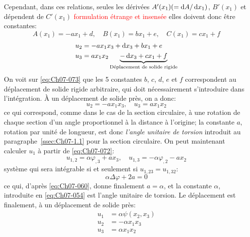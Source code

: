 Cependant, dans ces relations, seules les dérivées $A'(x_1) (=\mathop{\mathrm{{}d}}\mathopen{} A /\mathop{\mathrm{{}d}}\mathopen{} x_1)$, $B'(x_1)$ et dépendent de $C'(x_1)$ \textcolor{red}{formulation étrange et insensée} elles doivent donc être constantes:
\begin{equation}
A(x_1) = -a x_1 +d,\quad B(x_1) = b x_1 +e,\quad C(x_1) = c x_1 +f
\end{equation}
\begin{equation}
    \begin{aligned}
        u_2 &= -a x_1 x_3 + \mathop{\mathrm{{}d}}\mathopen{} x_3 + b x_1 + e\\
        u_3 &= a x_1 x_2 \underbrace{- \mathop{\mathrm{{}d}}\mathopen{} x_3 + c x_1 + f}_{\text{Déplacement de solide rigide}}
    \end{aligned}
    \label{eq:Ch07-073} 
\end{equation}
On voit sur \eqref{eq:Ch07-073} que les 5 constantes $b$, $c$, $d$, $e$ et $f$ correspondent au déplacement de solide rigide arbitraire, qui doit nécessairement s'introduire dans l'intégration.
\`A un déplacement de solide près, on a donc: 
\begin{equation}
    u_2 = -a x_1 x_3, \quad u_3 = a x_1 x_2
    \label{eq:Ch07-074}
\end{equation}
ce qui correspond, comme dans le cas de la section circulaire, à une rotation de chaque section d'un angle proportionnel à la distance à l'origine; la constante $a$, rotation par unité de longueur, est donc \emph{l'angle unitaire de torsion} introduit au paragraphe~\ref{ssec:Ch07-1.1} pour la section circulaire.
On peut maintenant calculer $u_1$ à partir de \eqref{eq:Ch07-072}: 
\begin{equation}
    u_{1,2} = \alpha \varphi_{,3} + a x_3, \quad u_{1,3} = -\alpha \varphi_{,2} - a x_2
    \label{eq:Ch07-075}
\end{equation}
système qui sera intégrable si et seulement si $u_{1,23} = u_{1,32}$:
\begin{displaymath}
    \alpha \Delta \varphi + 2 a = 0
\end{displaymath}
ce qui, d'après \eqref{eq:Ch07-060}, donne finalement $a=\alpha$, et la constante $\alpha$, introduite en \eqref{eq:Ch07-054} est l'angle unitaire de torsion. Le déplacement est finalement, à un déplacement de solide près: 
\begin{equation}
    \begin{aligned}
        u_1 &= \alpha \psi (x_2, x_3) \\
        u_2 &= - \alpha x_1 x_3 \\
        u_3 &= \alpha x_1 x_2
    \end{aligned}
    \label{eq:Ch07-076}
\end{equation}
